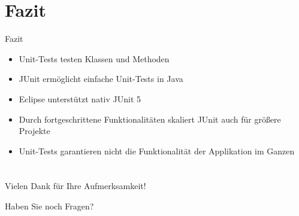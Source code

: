 \documentclass[utf8,t,aspectratio=169]{beamer}
\begin{document}
  \section{Fazit}
    \begin{frame}{Fazit}
      \begin{itemize}
        \item Unit-Tests testen Klassen und Methoden
        \item JUnit ermöglicht einfache Unit-Tests in Java
        \item Eclipse unterstützt nativ JUnit 5
        \item Durch fortgeschrittene Funktionalitäten skaliert JUnit auch für größere Projekte
        \item Unit-Tests garantieren nicht die Funktionalität der Applikation im Ganzen
      \end{itemize}
    \end{frame}

	\section*{}
    \begin{frame}[c]
      \Huge
      \centering
      Vielen Dank für Ihre Aufmerksamkeit!

      Haben Sie noch Fragen?
    \end{frame}
\end{document}
